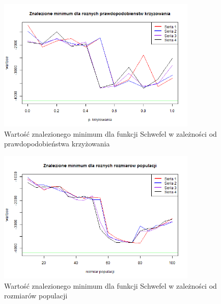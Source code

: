 \documentclass[11pt, a4paper]{article}
\begin{document}
\begin{figure}[H]
	\begin{center}
		\includegraphics[width=0.85\textwidth]{./assets/Schwefel3.png}
		\caption{Wartość znalezionego minimum dla funkcji Schwefel w zależności od prawdopodobieństwa krzyżowania}
		\label{fig:schwefel3}
	\end{center}
\end{figure}

\begin{figure}[H]
	\begin{center}
		\includegraphics[width=0.85\textwidth]{./assets/Schwefel4.png}
		\caption{Wartość znalezionego minimum dla funkcji Schwefel w zależności od rozmiarów populacji}
		\label{fig:schwefel4}
	\end{center}
\end{figure}
\end{document}
